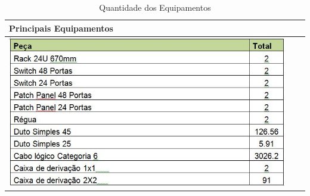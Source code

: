 \begin{table}[h!]
\centering
\caption{Quantidade dos Equipamentos}
\label{tab3}
\begin{tabular}{|l|l|l|}
\hline
\multicolumn{1}{|l|}{Principais Equipamentos} \\ \hline
\includegraphics[scale=0.5]{fig3}        \\ \hline

\end{tabular}
\end{table}